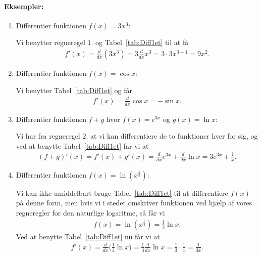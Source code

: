 \paragraph*{Eksempler:}
\begin{enumerate}
\item Differentier funktionen $f(x)=3x^3$:

Vi benytter regneregel $1.$ og Tabel~\ref{tab:Diff1et} til at få
\begin{align*}
f'(x) = \frac{d}{dx} (3x^3) = 3 \frac{d}{dx} x^3 = 3 \cdot 3 x^{3-1} = 9x^2.
\end{align*}
\item Differentier funktionen $f(x)=\cos x$:

Vi benytter Tabel~\ref{tab:Diff1et} og får
\begin{align*}
f'(x) = \frac{d}{dx} \cos x = - \sin x.
\end{align*}
\item Differentier funktionen $f+g$ hvor $f(x)=e^{3x}$ og $g(x)= \ln x$:

Vi har fra regneregel $2.$ at vi kan differentiere de to funktioner hver for sig, og ved at benytte Tabel~\ref{tab:Diff1et} får vi at
\begin{align*}
(f+g)'(x) = f'(x) + g'(x) = \frac{d}{dx} e^{3x} + \frac{d}{dx}\ln x = 3e^{3x} + \frac{1}{x}.
\end{align*}
\item Differentier funktionen $f(x)=\ln(x^{\frac{1}{3}})$:

Vi kan ikke umiddelbart bruge Tabel~\ref{tab:Diff1et} til at differentiere $f(x)$ på denne form, men hvis vi i stedet omskriver funktionen ved hjælp af vores regneregler for den naturlige logaritme, så får vi
\begin{align*}
f(x) = \ln(x^{\frac{1}{3}}) = \frac{1}{3} \ln x.
\end{align*} 
Ved at benytte Tabel~\ref{tab:Diff1et} nu får vi at
\begin{align*}
f'(x) = \frac{d}{dx}\Big(\frac{1}{3} \ln x\Big)=\frac{1}{3} \frac{d}{dx}\ln x= \frac{1}{3} \cdot \frac{1}{x} = \frac{1}{3x}.
\end{align*}
\end{enumerate}
